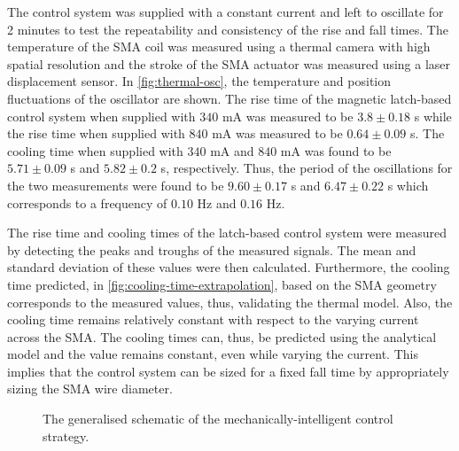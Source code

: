The control system was supplied with a constant current and left to oscillate for 2 minutes to test the repeatability and consistency of the rise and fall times. The temperature of the SMA coil was measured using a thermal camera with high spatial resolution and the stroke of the SMA actuator was measured using a laser displacement sensor. In \cref{fig:thermal-osc}, the temperature and position fluctuations of the oscillator are shown. The rise time of the magnetic latch-based control system when supplied with $340$ mA was measured to be $3.8 \pm 0.18$ s while the rise time when supplied with $840$ mA was measured to be $0.64 \pm 0.09$ s. The cooling time when supplied with $340$ mA and $840$ mA was found to be $5.71 \pm 0.09$ s and $5.82 \pm 0.2$ s, respectively. Thus, the period of the oscillations for the two measurements were found to be $9.60 \pm 0.17$ s and $6.47 \pm 0.22$ s which corresponds to a frequency of $0.10$ Hz and $0.16$ Hz.

The rise time and cooling times of the latch-based control system were measured by detecting the peaks and troughs of the measured signals. The mean and standard deviation of these values were then calculated. Furthermore, the cooling time predicted, in \cref{fig:cooling-time-extrapolation}, based on the SMA geometry corresponds to the measured values, thus, validating the thermal model. Also, the cooling time remains relatively constant with respect to the varying current across the SMA. The cooling times can, thus, be predicted using the analytical model and the value remains constant, even while varying the current. This implies that the control system can be sized for a fixed fall time by appropriately sizing the SMA wire diameter.

\begin{figure}[hbt!] %
  \centering
  
  \caption{The generalised schematic of the mechanically-intelligent control strategy.}
  \label{fig:mi-osc-flowchart}
\end{figure}


